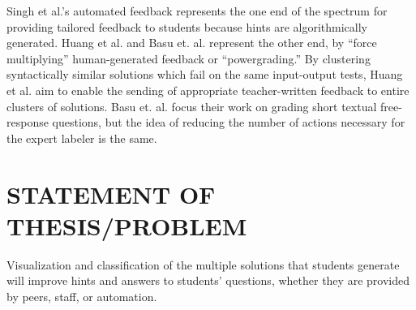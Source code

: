 \documentclass[12pt]{article}
\begin{document}
Singh et al.'s automated feedback represents the one end of the spectrum for providing tailored feedback to students because hints are algorithmically generated. Huang et al. \cite{MOOCshop} and Basu et. al. \cite{basupowergrading} represent the other end, by ``force multiplying'' human-generated feedback or ``powergrading.'' By clustering syntactically similar solutions which fail on the same input-output tests, Huang et al. aim to enable the sending of appropriate teacher-written feedback to entire clusters of solutions. Basu et. al. \cite{basupowergrading} focus their work on grading short textual free-response questions, but the idea of reducing the number of actions necessary for the expert labeler is the same.

%

\section{STATEMENT OF THESIS/PROBLEM}

Visualization and classification of the multiple solutions that students generate will improve hints and answers to students' questions, whether they are provided by peers, staff, or automation. 
\end{document}
